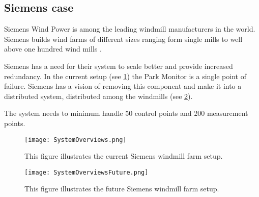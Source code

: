 \subsection{Siemens case}

Siemens Wind Power is among the leading windmill manufacturers in the world. 
Siemens builds wind farms of different sizes ranging form single mills to well above one hundred wind mills \cite{simensOffShoreProjects, simensOnShoreProjects}.

Siemens has a need for their system to scale better and provide increased redundancy.
In the current setup (see \cref{fig:currentSiemensSetup}) the Park Monitor is a single point of failure.
Siemens has a vision of removing this component and make it into a distributed system, distributed among the windmills (see \cref{fig:futureSiemensSetup}).

The system needs to minimum handle 50 control points and 200 measurement points.

\begin{figure}
	\centering
	\texttt{[image: SystemOverviews.png]} 
	\caption[Illustrates the current Siemens windmill farm setup]{
		\label{fig:currentSiemensSetup} 
		\footnotesize{%
			This figure illustrates the current Siemens windmill farm setup.
		}
	}
\end{figure}

\begin{figure}
	\centering
	\texttt{[image: SystemOverviewsFuture.png]} 
	\caption[Illustrates the future Siemens windmill farm setup]{
		\label{fig:futureSiemensSetup} 
		\footnotesize{%
			This figure illustrates the future Siemens windmill farm setup.
		}
	}
\end{figure}
